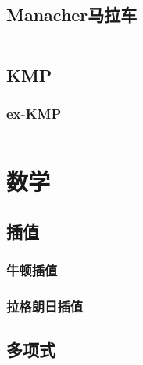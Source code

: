 \documentclass[a4paper]{article}
\begin{document}
\begin{multicols}{2}


			\subsection{Manacher马拉车}
				\inputminted{cpp}{../src/string/manacher.cpp}

			\subsection{KMP}
				

				\subsubsection{ex-KMP}
					\inputminted{cpp}{../src/string/exKMP.cpp}
			




		\section{数学}

			\subsection{插值}
				\subsubsection{牛顿插值}
					

				\subsubsection{拉格朗日插值}
					
			
			\subsection{多项式}

\end{multicols}
\end{document}
